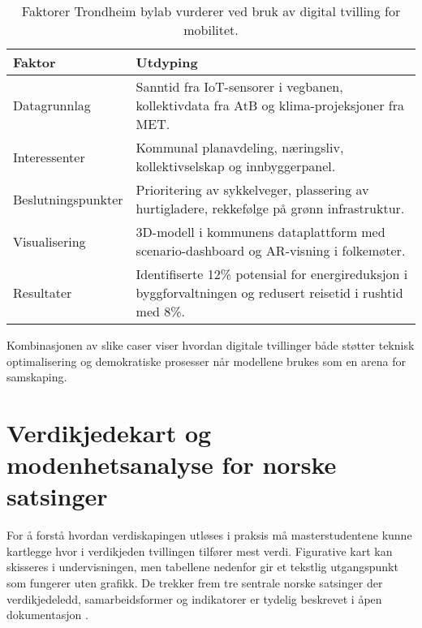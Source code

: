\begin{table}[ht]
    \centering
    \caption{Faktorer Trondheim bylab vurderer ved bruk av digital tvilling for mobilitet.}
    \label{tab:kap01-trondheim}
    \begin{tabular}{p{}p{}}
        \toprule
        \textbf{Faktor} & \textbf{Utdyping} \\
        \midrule
        Datagrunnlag & Sanntid fra IoT-sensorer i vegbanen, kollektivdata fra AtB og klima-projeksjoner fra MET. \\
        Interessenter & Kommunal planavdeling, næringsliv, kollektivselskap og innbyggerpanel. \\
        Beslutningspunkter & Prioritering av sykkelveger, plassering av hurtigladere, rekkefølge på grønn infrastruktur. \\
        Visualisering & 3D-modell i kommunens dataplattform med scenario-dashboard og AR-visning i folkemøter. \\
        Resultater & Identifiserte 12\% potensial for energireduksjon i byggforvaltningen og redusert reisetid i rushtid med 8\%. \\
        \bottomrule
    \end{tabular}
\end{table}

Kombinasjonen av slike caser viser hvordan digitale tvillinger både støtter teknisk optimalisering og demokratiske prosesser når modellene brukes som en arena for samskaping.

\section{Verdikjedekart og modenhetsanalyse for norske satsinger}
For å forstå hvordan verdiskapingen utløses i praksis må masterstudentene kunne kartlegge hvor i verdikjeden tvillingen tilfører mest verdi. Figurative kart kan skisseres i undervisningen, men tabellene nedenfor gir et tekstlig utgangspunkt som fungerer uten grafikk. De trekker frem tre sentrale norske satsinger der verdikjedeledd, samarbeidsformer og indikatorer er tydelig beskrevet i åpen dokumentasjon \citep{sintef2021digital,statnett2023digital,statsbygg2023loopfront}.

